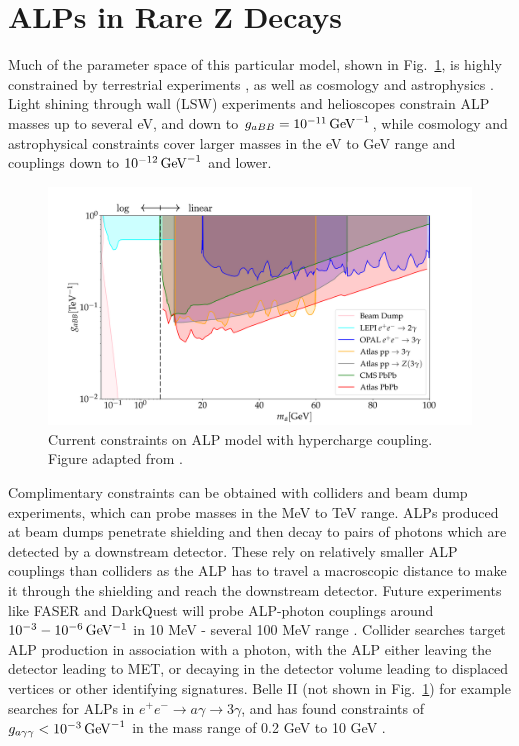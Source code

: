 \documentclass[aps,onecolumn,twoside,secnumarabic,12pt,balancelastpage,amsmath,amssymb,nofootinbib,hyperref=pdftex]{revtex4}
\begin{document}
\section{ALPs in Rare Z Decays}
Much of the parameter space of this particular model, shown in Fig.~\ref{fig:current_constraints}, is highly constrained by terrestrial experiments \cite{Graham:2015ouw}, as well as cosmology and astrophysics \cite{Powell:2016tfs,Millea:2015qra}. Light shining through wall (LSW) experiments and helioscopes constrain ALP masses up to several eV, and down to $g_{a BB} = 10^{-11}\,\rm{GeV}^{-1}$, while cosmology and astrophysical constraints cover larger masses in the eV to GeV range and couplings down to $10^{-12}\,\rm{GeV}^{-1}$ and lower.
\begin{figure}[htbp]
\begin{center}
\includegraphics[width=16cm]{Existing_constraints2.png}
\caption{Current constraints on ALP model with hypercharge coupling. Figure adapted from  \cite{Jaeckel:2015jla,Sirunyan:2018fhl,Aad:2020cje,Aad:2015bua,Knapen:2016moh}.}
\label{fig:current_constraints}
\end{center}
\end{figure}
Complimentary constraints can be obtained with colliders and beam dump experiments, which can probe masses in the MeV to TeV range. ALPs produced at beam dumps penetrate shielding and then decay to pairs of photons which are detected by a downstream detector. These rely on relatively smaller ALP couplings than colliders as the ALP has to travel a macroscopic distance to make it through the shielding and reach the downstream detector. Future experiments like FASER and DarkQuest will probe ALP-photon couplings around $10^{-3} - 10^{-6}\,\rm{GeV^{-1}}$ in  10 MeV - several 100 MeV range \cite{Feng:2018pew,Kowalczyk:2920agg}. Collider searches target ALP production in association with a photon, with the ALP either leaving the detector leading to MET, or decaying in the detector volume leading to displaced vertices or other identifying signatures. Belle II (not shown in Fig.~\ref{fig:current_constraints}) for example searches for ALPs in $e^{+} e^{-} \rightarrow a\gamma \rightarrow 3\gamma$, and has found constraints of $g_{a\gamma\gamma} < 10^{-3}\,\rm{GeV}^{-1}$ in the mass range of 0.2 GeV to 10 GeV \cite{BelleII:2020fag}.
\end{document}
